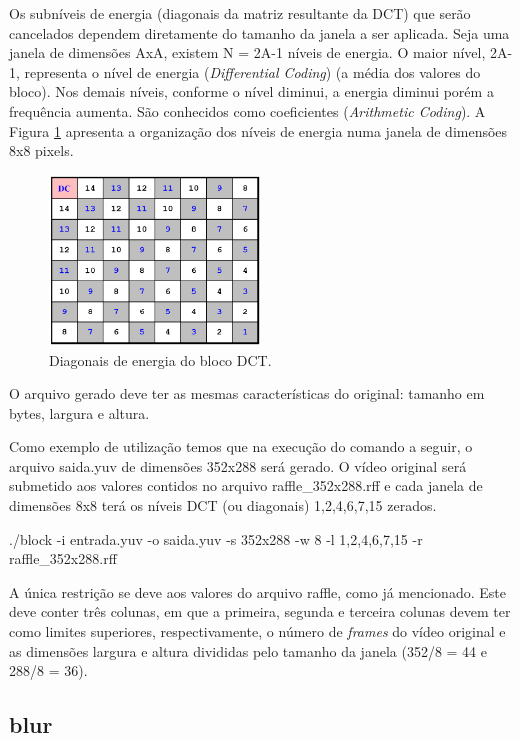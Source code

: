 Os subníveis de energia (diagonais da matriz resultante da DCT) que serão cancelados dependem diretamente do tamanho da janela a ser aplicada. Seja uma janela de dimensões AxA, existem N = 2A-1 níveis de energia. O maior nível, 2A-1, representa o nível de energia  (\emph{Differential Coding}) (a média dos valores do bloco). Nos demais níveis, conforme o nível diminui, a energia diminui porém a frequência aumenta. São conhecidos como coeficientes  (\emph{Arithmetic Coding}). A Figura \ref{fig:niveisdct} apresenta a organização dos níveis de energia numa janela de dimensões 8x8 pixels.

\begin{figure}[!htb]
	\centering
	\includegraphics[width=0.5\textwidth]{./imgs/niveisdct.png}
	\caption{Diagonais de energia do bloco DCT.}
	\label{fig:niveisdct}
	\fonte{\cite{}}
\end{figure}

O arquivo gerado deve ter as mesmas características do original: tamanho em bytes, largura e altura.

Como exemplo de utilização temos que na execução do comando a seguir, o arquivo saida.yuv de dimensões 352x288 será gerado. O vídeo original será submetido aos valores contidos no arquivo raffle\_352x288.rff e cada janela de dimensões 8x8 terá os níveis DCT (ou diagonais) 1,2,4,6,7,15 zerados.

./block -i entrada.yuv -o saida.yuv -s 352x288 -w 8 -l 1,2,4,6,7,15 -r raffle\_352x288.rff

A única restrição se deve aos valores do arquivo raffle, como já mencionado. Este deve conter três colunas, em que a primeira, segunda e terceira colunas devem ter como limites superiores, respectivamente, o número de \emph{frames} do vídeo original e as dimensões largura e altura divididas pelo tamanho da janela (352/8 = 44 e 288/8 = 36).

\subsection{blur}

